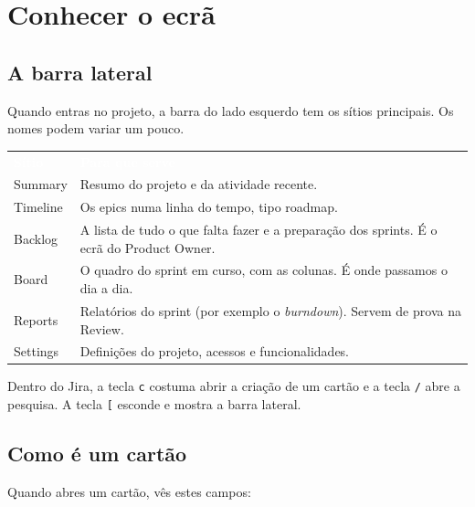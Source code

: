 \documentclass[11pt,a4paper]{article}
\newcommand{\th}[1]{\textcolor{white}{\sffamily\bfseries #1}}
\newcommand{\tabelaini}{\begingroup\small\renewcommand{\arraystretch}{1.45}\rowcolors{2}{azulclaro!55}{white}}
\newcommand{\tabelafim}{\endgroup}
\begin{document}
\section{Conhecer o ecrã}

\subsection{A barra lateral}

Quando entras no projeto, a barra do lado esquerdo tem os sítios principais. Os nomes podem variar um pouco.

\tabelaini
\begin{tabularx}{\textwidth}{N{3cm} Y}
   \th{Sítio} & \th{Para que serve} \\
  Summary & Resumo do projeto e da atividade recente. \\
  Timeline & Os epics numa linha do tempo, tipo roadmap. \\
  Backlog & A lista de tudo o que falta fazer e a preparação dos sprints. É o ecrã do Product Owner. \\
  Board & O quadro do sprint em curso, com as colunas. É onde passamos o dia a dia. \\
  Reports & Relatórios do sprint (por exemplo o \textit{burndown}). Servem de prova na Review. \\
  Settings & Definições do projeto, acessos e funcionalidades. \\
  \bottomrule
\end{tabularx}
\tabelafim

\begin{tcolorbox}[dica, title={Dica: atalhos de teclado}]
  Dentro do Jira, a tecla \texttt{c} costuma abrir a criação de um cartão e a tecla \texttt{/} abre a pesquisa. A tecla \texttt{[} esconde e mostra a barra lateral.
\end{tcolorbox}

\subsection{Como é um cartão}

Quando abres um cartão, vês estes campos:
\end{document}
